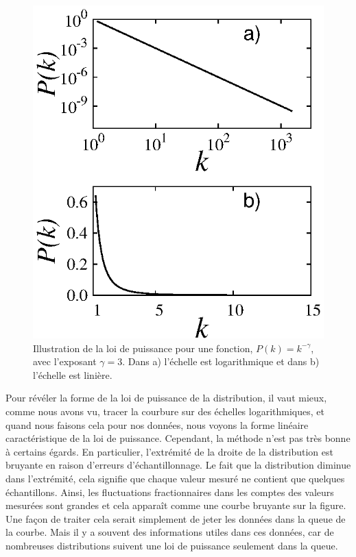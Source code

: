 \begin{figure}[h!]
	\centering
	\includegraphics[scale=1.2]{./figures/fig-sans-echelle}
	\caption{Illustration de la loi de puissance pour une fonction, $P(k)=k^{-\gamma}$, avec l'exposant $\gamma=3$. Dans a) l'échelle est logarithmique et dans b) l'échelle est linière.}
	\label{sans-echelle-3}
\end{figure}
Pour révéler la forme de la loi de puissance de la distribution, il vaut mieux, comme nous avons vu, tracer la courbure sur des échelles logarithmiques, et quand nous faisons cela pour nos données, nous voyons la forme linéaire caractéristique de la loi de puissance.
Cependant, la méthode n'est pas très bonne à certains égards. En particulier, l'extrémité de la droite de la distribution est bruyante en raison d'erreurs d'échantillonnage. Le fait que la distribution diminue dans l'extrémité, cela signifie que chaque valeur mesuré ne contient que quelques échantillons. Ainsi, les fluctuations fractionnaires dans les comptes des valeurs mesurées sont grandes et cela apparaît comme une courbe bruyante sur la figure. Une façon de traiter cela serait simplement de jeter les données dans la queue de la courbe. Mais il y a souvent des informations utiles dans ces données, car de nombreuses distributions suivent une loi de puissance seulement dans la queue.


